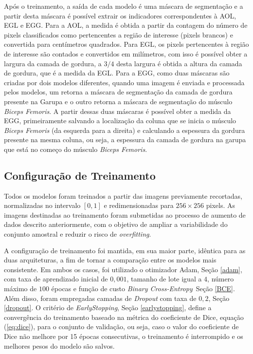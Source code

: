Após o treinamento, a saída de cada modelo é uma máscara de segmentação e a partir desta máscara é possível extrair os indicadores correspondentes à AOL, EGL e EGG. Para a AOL, a medida é obtida a partir da contagem do número de pixels classificados como pertencentes a região de interesse (pixels brancos) e convertida para centímetros quadrados. Para EGL, os pixels pertencentes à região de interesse são contados e convertidos em milímetros, com isso é possível obter a largura da camada de gordura, a $3/4$ desta largura é obtida a altura da camada de gordura, que é a medida da EGL. Para a EGG, como duas máscaras são criadas por dois modelos diferentes, quando uma imagem é enviada e processada pelos modelos, um retorna a máscara de segmentação da camada de gordura presente na Garupa e o outro retorna a máscara de segmentação do músculo \textit{Biceps Femoris}. A partir dessas duas máscaras é possível obter a medida da EGG, primeiramente salvando a localização da coluna que se inicia o músculo \textit{Biceps Femoris} (da esquerda para a direita) e calculando a espessura da gordura presente na mesma coluna, ou seja, a espessura da camada de gordura na garupa que está no começo do músculo \textit{Biceps Femoris}. 
\subsection{Configuração de Treinamento}

Todos os modelos foram treinados a partir das imagens previamente recortadas, normalizadas no intervalo $[0,1]$ e redimensionadas para $256 \times 256$ pixels. As imagens destinadas ao treinamento foram submetidas ao processo de aumento de dados descrito anteriormente, com o objetivo de ampliar a variabilidade do conjunto amostral e reduzir o risco de \textit{overfitting}.

A configuração de treinamento foi mantida, em sua maior parte, idêntica para as duas arquiteturas, a fim de tornar a comparação entre os modelos mais consistente. Em ambos os casos, foi utilizado o otimizador Adam, Seção \ref{adam}, com taxa de aprendizado inicial de $0{,}001$, tamanho de lote igual a $4$, número máximo de $100$ épocas e função de custo \textit{Binary Cross-Entropy}\ Seção \ref{BCE}. Além disso, foram empregadas camadas de \textit{Dropout} com taxa de $0{,}2$, Seção \ref{dropout}. O critério de \textit{EarlyStopping}, Seção \ref{earlystopping}, define a convergência do treinamento baseado na métrica do coeficiente de Dice, equação (\ref{eq:dice}), para o conjunto de validação, ou seja, caso o valor do coeficiente de Dice não melhore por 15 épocas consecutivas, o treinamento é interrompido e os melhores pesos do modelo são salvos.

